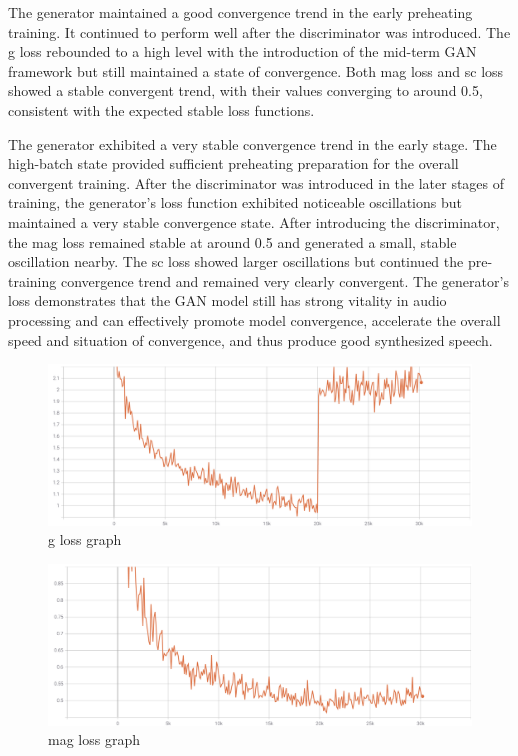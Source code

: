 \documentclass[10pt,journal,compsoc]{IEEEtran}
\begin{document}
The generator maintained a good convergence trend in the early preheating training. It continued to perform well after the discriminator was introduced. The g loss rebounded to a high level with the introduction of the mid-term GAN framework but still maintained a state of convergence. Both mag loss and sc loss showed a stable convergent trend, with their values converging to around 0.5, consistent with the expected stable loss functions.

The generator exhibited a very stable convergence trend in the early stage. The high-batch state provided sufficient preheating preparation for the overall convergent training. After the discriminator was introduced in the later stages of training, the generator's loss function exhibited noticeable oscillations but maintained a very stable convergence state. After introducing the discriminator, the mag loss remained stable at around 0.5 and generated a small, stable oscillation nearby. The sc loss showed larger oscillations but continued the pre-training convergence trend and remained very clearly convergent. The generator's loss demonstrates that the GAN model still has strong vitality in audio processing and can effectively promote model convergence, accelerate the overall speed and situation of convergence, and thus produce good synthesized speech.

\begin{figure}
    \centering
    \includegraphics[scale=0.55] {PNG/4-5.png}
    \caption{g loss graph}
    \label{fig:4-5}
\end{figure}

\begin{figure}
    \centering
    \includegraphics[scale=0.55] {PNG/4-6.png}
    \caption{mag loss graph}
    \label{fig:4-6}
\end{figure}
\end{document}
